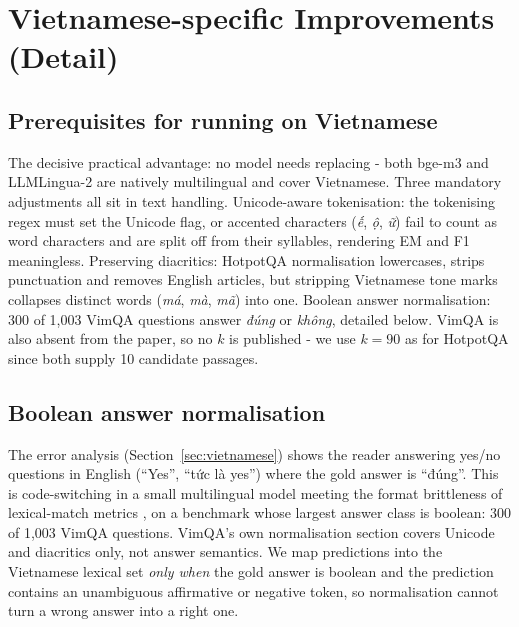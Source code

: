 \documentclass[11pt]{article}
\begin{document}
\clearpage


\clearpage
\appendix

\section{Vietnamese-specific Improvements (Detail)}
\label{app:vi}
\label{sec:vi}
\label{sec:improve}

\subsection{Prerequisites for running on Vietnamese}
\label{sec:vnconfig}

The decisive practical advantage: no model needs replacing - both bge-m3
and LLMLingua-2 are natively multilingual and cover Vietnamese. Three mandatory
adjustments all sit in text handling. Unicode-aware tokenisation: the
tokenising regex must set the Unicode flag, or accented characters (\emph{ế},
\emph{ộ}, \emph{ữ}) fail to count as word characters and are split off from their
syllables, rendering EM and F1 meaningless. Preserving diacritics:
HotpotQA normalisation lowercases, strips punctuation and removes English
articles, but stripping Vietnamese tone marks collapses distinct words
(\emph{má}, \emph{mà}, \emph{mã}) into one. Boolean answer
normalisation: 300 of 1,003 VimQA questions answer \emph{đúng} or
\emph{không},
detailed below. VimQA is also absent from the paper, so no $k$ is published - we
use $k=90$ as for HotpotQA since both supply 10 candidate passages.

\subsection{Boolean answer normalisation}
The error analysis (Section~\ref{sec:vietnamese}) shows the reader answering
yes/no questions in English (``Yes'', ``tức là yes'') where the gold answer is
``đúng''. This is code-switching in a small multilingual model
\citep{marchisio2024confusion} meeting the format brittleness of lexical-match
metrics \citep{kamalloo2023evaluating}, on a benchmark whose largest answer class
is boolean: 300 of 1,003 VimQA questions. VimQA's own normalisation section
\citep{le2022vimqa} covers Unicode and diacritics only, not answer semantics. We
map predictions into the Vietnamese lexical set \emph{only when} the gold answer
is boolean and the prediction contains an unambiguous affirmative or negative
token, so normalisation cannot turn a wrong answer into a right one.
\end{document}
